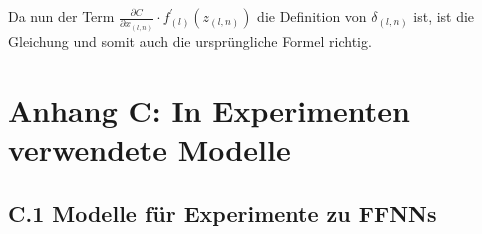 \documentclass[
	a4paper,
	12pt,
	ngerman,
	oneside
]{scrreprt}											%
\begin{document}
				Da nun der Term $\frac{\partial C}{\partial x_{(l,n)}} \cdot f_{(l)}^{\prime}(z_{(l,n)})$ die Definition von $\delta_{(l,n)}$ ist, ist die Gleichung und somit auch die ursprüngliche Formel richtig.
				
	
	
		\newpage
		\vspace*{2cm}	
		\section*{Anhang C: In Experimenten verwendete Modelle}
	
			\subsection*{C.1 Modelle für Experimente zu FFNNs}
				
\end{document}
